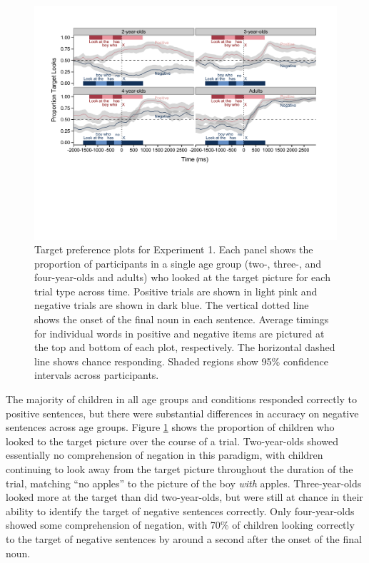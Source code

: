 \documentclass[man]{apa2}
\begin{document}
\begin{figure}
\begin{center} 
\includegraphics[width=6in]{simpleplots_nothing.pdf}
\caption{\label{fig:e1simple} Target preference plots for Experiment 1. Each panel shows the proportion of participants in a single age group (two-, three-, and four-year-olds and adults) who looked at the target picture for each trial type across time. Positive trials are shown in light pink and negative trials are shown in dark blue.  The vertical dotted line shows the onset of the final noun in each sentence. Average timings for individual words in positive and negative items are pictured at the top and bottom of each plot, respectively. The horizontal dashed line shows chance responding. Shaded regions show 95\% confidence intervals across participants.}
\end{center} 
\end{figure}

The majority of children in all age groups and conditions responded correctly to positive sentences, but there were substantial differences in accuracy on negative sentences across age groups. Figure \ref{fig:e1simple} shows the proportion of children who looked to the target picture over the course of a trial. Two-year-olds showed essentially no comprehension of negation in this paradigm, with children continuing to look away from the target picture throughout the duration of the trial, matching ``no apples'' to the picture of the boy \emph{with} apples.  Three-year-olds looked more at the target than did two-year-olds, but were still at chance in their ability to identify the target of negative sentences correctly.  Only four-year-olds showed some comprehension of negation, with 70\% of children looking correctly to the target of negative sentences by around a second after the onset of the final noun.  
\end{document}

